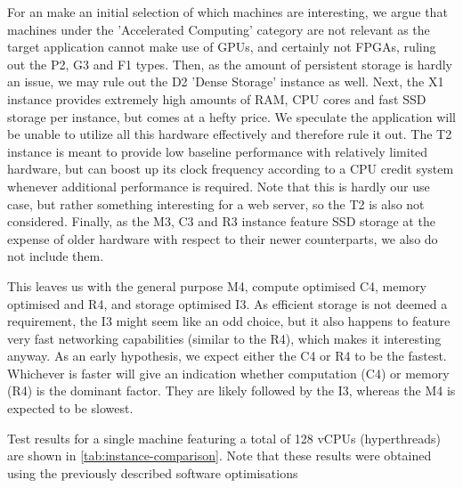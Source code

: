 \documentclass{article}
\begin{document}
For an make an initial selection of which machines are interesting, we argue that machines under the 'Accelerated Computing' category are not relevant as the target application cannot make use of GPUs, and certainly not FPGAs, ruling out the P2, G3 and F1 types. Then, as the amount of persistent storage is hardly an issue, we may rule out the D2 'Dense Storage' instance as well. Next, the X1 instance provides extremely high amounts of RAM, CPU cores and fast SSD storage per instance, but comes at a hefty price. We speculate the application will be unable to utilize all this hardware effectively and therefore rule it out. The T2 instance is meant to provide low baseline performance with relatively limited hardware, but can boost up its clock frequency according to a CPU credit system whenever additional performance is required. Note that this is hardly our use case, but rather something interesting for a web server, so the T2 is also not considered. Finally, as the M3, C3 and R3 instance feature SSD storage at the expense of older hardware with respect to their newer counterparts, we also do not include them.

This leaves us with the general purpose M4, compute optimised C4, memory optimised and R4, and storage optimised I3.
As efficient storage is not deemed a requirement, the I3 might seem like an odd choice, but it also happens to feature very fast networking capabilities (similar to the R4), which makes it interesting anyway.
As an early hypothesis, we expect either the C4 or R4 to be the fastest.
Whichever is faster will give an indication whether computation (C4) or memory (R4) is the dominant factor.
They are likely followed by the I3, whereas the M4 is expected to be slowest.

Test results for a single machine featuring a total of 128 vCPUs (hyperthreads) are shown in \cref{tab:instance-comparison}. Note that these results were obtained using the previously described software optimisations
\end{document}
